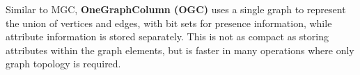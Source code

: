 
Similar to MGC, {\bf OneGraphColumn (OGC)} uses a single graph to
represent the union of vertices and edges, with bit sets for presence
information, while attribute information is stored separately.  This
is not as compact as storing attributes within the graph elements, but
is faster in many operations where only graph topology is required.


